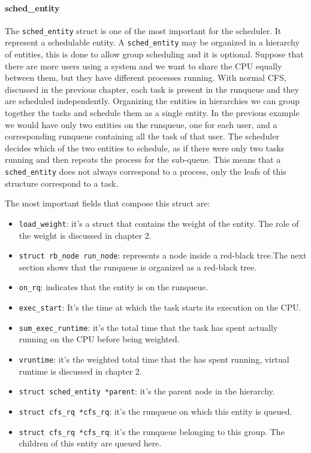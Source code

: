 \paragraph{sched\_entity}
The \verb|sched_entity| struct is one of the most important for the scheduler. It represent a schedulable entity.
A \verb|sched_entity| may be organized in a hierarchy of entities, this is done to allow group scheduling and it is optional. Suppose that there are more users using a system and we want to share the CPU equally between them, but they have different processes running. With normal CFS, discussed in the previous chapter, each task is present in the runqueue and they are scheduled independently. Organizing the entities in hierarchies we can group together the tasks and schedule them as a single entity. In the previous example we would have only two entities on the runqueue, one for each user, and a corresponding runqueue containing all the task of that user. The scheduler decides which of the two entities to schedule, as if there were only two tasks running and then repeats the process for the sub-queue. This means that a \verb|sched_entity| does not always correspond to a process, only the leafs of this structure correspond to a task. 

The most important fields that compose this struct are:
\begin{itemize}
    \item \verb|load_weight|: it's a struct that contains the weight of the entity. The role of the weight is discussed in chapter 2.
    \item \verb|struct rb_node run_node|: represents a node inside a red-black tree.The next section shows that the runqueue is organized as a red-black tree.
    \item \verb|on_rq|: indicates that the entity is on the runqueue.
    \item \verb|exec_start|: It's the time at which the task starts its execution on the CPU.
    \item \verb|sum_exec_runtime|: it's the total time that the task has spent actually running on the CPU before being weighted.
    \item \verb|vruntime|: it's the weighted total time that the has spent running, virtual runtime is discussed in chapter 2.
    \item \verb|struct sched_entity *parent|: it's the parent node in the hierarchy.
    \item \verb|struct cfs_rq *cfs_rq|: it's the runqueue on which this entity is queued.
    \item \verb|struct cfs_rq *cfs_rq|: it's the runqueue belonging to this group. The children of this entity are queued here.
\end{itemize}
